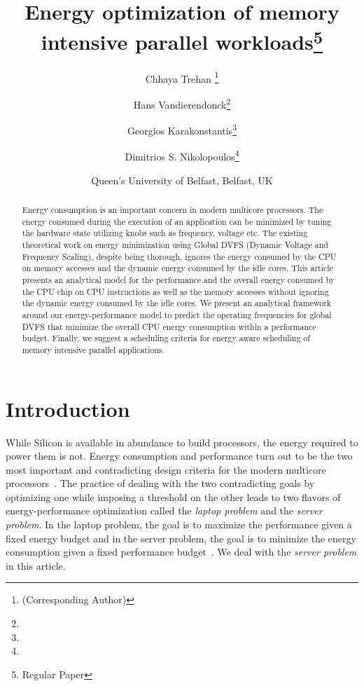\documentclass[11pt, letterpaper]{article}
\begin{document}
\title{Energy optimization of memory intensive parallel workloads\thanks{Regular Paper}}
\date{Queen's University of Belfast, Belfast, UK}




\author{Chhaya Trehan \thanks{\mailt (Corresponding Author)} \and Hans Vandierendonck\thanks{\mailv} \and Georgios Karakonstantis\thanks{\mailk}\and Dimitrios S. Nikolopoulos\thanks{\mailn}}








\begin{titlepage}
\maketitle


\begin{abstract}
Energy consumption is an important concern in modern multicore processors. The energy consumed during the execution of an application can be minimized by tuning the hardware state utilizing knobs such as frequency, voltage etc. The existing theoretical work on energy minimization using Global DVFS (Dynamic Voltage and Frequency Scaling), despite being thorough, ignores the energy consumed by the CPU on memory accesses and the dynamic energy consumed by the idle cores. This article presents an analytical model for the performance and the overall energy consumed  by the CPU chip on CPU instructions as well as the memory accesses without ignoring the dynamic energy consumed by the idle cores. We present an analytical framework around our energy-performance model to predict the operating frequencies for global DVFS that minimize the overall CPU energy consumption within a performance budget. Finally, we suggest a scheduling criteria for energy aware scheduling of memory intensive parallel applications.
\end{abstract}
\end{titlepage}

\section{Introduction}
While Silicon is available in abundance to build processors, the energy required to power them is not. Energy consumption and performance turn out to be the two most important and contradicting design criteria for the modern multicore processors~\cite{EnergyCost1, EnergyCost2, EnergyCost3}. The practice of dealing with the two contradicting goals by optimizing one while imposing a threshold on the other leads to two flavors of energy-performance optimization called the \emph{laptop problem} and the \emph{server problem}. In the laptop problem, the goal is to maximize the performance given a fixed energy budget and in the server problem, the goal is to minimize the energy consumption given a fixed performance budget~\cite{ServerLaptopProblem, ServerProblem}. We deal with the \emph{server problem} in this article.
\end{document}
